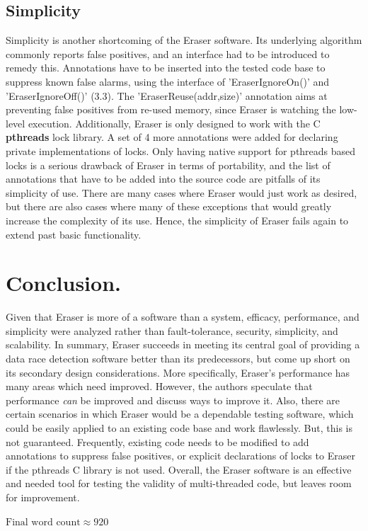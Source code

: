 \documentclass[11pt]{article}
\begin{document}
\subsection{Simplicity}
Simplicity is another shortcoming of the Eraser software. Its underlying algorithm commonly reports false positives, and an interface had to be introduced to remedy this. Annotations have to be inserted into the tested code base to suppress known false alarms, using the interface of 'EraserIgnoreOn()' and 'EraserIgnoreOff()' (3.3). The 'EraserReuse(addr,size)' annotation aims at preventing false positives from re-used memory, since Eraser is watching the low-level execution. Additionally, Eraser is only designed to work with the C \textbf{pthreads} lock library. A set of 4 more annotations were added for declaring private implementations of locks. Only having native support for pthreads based locks is a serious drawback of Eraser in terms of portability, and the list of annotations that have to be added into the source code are pitfalls of its simplicity of use. There are many cases where Eraser would just work as desired, but there are also cases where many of these exceptions that would greatly increase the complexity of its use. Hence, the simplicity of Eraser fails again to extend past basic functionality.

\section{Conclusion.}
Given that Eraser is more of a software than a system, efficacy, performance, and simplicity were analyzed rather than fault-tolerance, security, simplicity, and scalability. In summary, Eraser succeeds in meeting its central goal of providing a data race detection software better than its predecessors, but come up short on its secondary design considerations. More specifically, Eraser's performance has many areas which need improved. However, the authors speculate that performance \textit{can} be improved and discuss ways to improve it. Also, there are certain scenarios in which Eraser would be a dependable testing software, which could be easily applied to an existing code base and work flawlessly. But, this is not guaranteed. Frequently, existing code needs to be modified to add annotations to suppress false positives, or explicit declarations of locks to Eraser if the pthreads C library is not used. Overall, the Eraser software is an effective and needed tool for testing the validity of multi-threaded code, but leaves room for improvement.

\paragraph{}
$ \text{Final word count} \approx 920$
\end{document}
